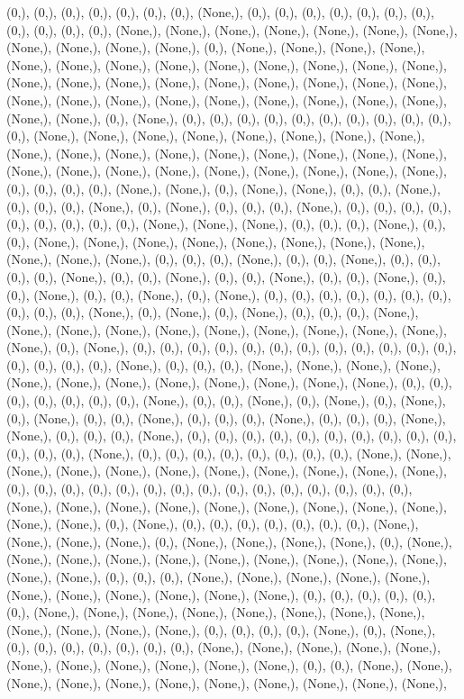 \documentclass{article}
\begin{document}
(0,), (0,), (0,), (0,), (0,), (0,), (0,), (None,), (0,), (0,), (0,), (0,), (0,), (0,), (0,), (0,), (0,), (0,), (0,), (None,), (None,), (None,), (None,), (None,), (None,), (None,), (None,), (None,), (None,), (None,), (0,), (None,), (None,), (None,), (None,), (None,), (None,), (None,), (None,), (None,), (None,), (None,), (None,), (None,), (None,), (None,), (None,), (None,), (None,), (None,), (None,), (None,), (None,), (None,), (None,), (None,), (None,), (None,), (None,), (None,), (None,), (None,), (None,), (None,), (0,), (None,), (0,), (0,), (0,), (0,), (0,), (0,), (0,), (0,), (0,), (0,), (0,), (None,), (None,), (None,), (None,), (None,), (None,), (None,), (None,), (None,), (None,), (None,), (None,), (None,), (None,), (None,), (None,), (None,), (None,), (None,), (None,), (None,), (None,), (None,), (None,), (None,), (None,), (0,), (0,), (0,), (0,), (None,), (None,), (0,), (None,), (None,), (0,), (0,), (None,), (0,), (0,), (0,), (None,), (0,), (None,), (0,), (0,), (0,), (None,), (0,), (0,), (0,), (0,), (0,), (0,), (0,), (0,), (0,), (None,), (None,), (None,), (0,), (0,), (0,), (None,), (0,), (0,), (None,), (None,), (None,), (None,), (None,), (None,), (None,), (None,), (None,), (None,), (None,), (0,), (0,), (0,), (None,), (0,), (0,), (None,), (0,), (0,), (0,), (0,), (None,), (0,), (0,), (None,), (0,), (0,), (None,), (0,), (0,), (None,), (0,), (0,), (None,), (0,), (0,), (None,), (0,), (None,), (0,), (0,), (0,), (0,), (0,), (0,), (0,), (0,), (0,), (0,), (None,), (0,), (None,), (0,), (None,), (0,), (0,), (0,), (None,), (None,), (None,), (None,), (None,), (None,), (None,), (None,), (None,), (None,), (None,), (0,), (None,), (0,), (0,), (0,), (0,), (0,), (0,), (0,), (0,), (0,), (0,), (0,), (0,), (0,), (0,), (0,), (0,), (None,), (0,), (0,), (0,), (None,), (None,), (None,), (None,), (None,), (None,), (None,), (None,), (None,), (None,), (None,), (None,), (0,), (0,), (0,), (0,), (0,), (0,), (0,), (None,), (0,), (0,), (None,), (0,), (None,), (0,), (None,), (0,), (None,), (0,), (0,), (None,), (0,), (0,), (0,), (None,), (0,), (0,), (0,), (None,), (None,), (0,), (0,), (0,), (None,), (0,), (0,), (0,), (0,), (0,), (0,), (0,), (0,), (0,), (0,), (0,), (0,), (0,), (None,), (0,), (0,), (0,), (0,), (0,), (0,), (0,), (0,), (None,), (None,), (None,), (None,), (None,), (None,), (None,), (None,), (None,), (None,), (None,), (0,), (0,), (0,), (0,), (0,), (0,), (0,), (0,), (0,), (0,), (0,), (0,), (0,), (0,), (0,), (None,), (None,), (None,), (None,), (None,), (None,), (None,), (None,), (None,), (None,), (None,), (0,), (None,), (0,), (0,), (0,), (0,), (0,), (0,), (0,), (None,), (None,), (None,), (None,), (0,), (None,), (None,), (None,), (None,), (0,), (None,), (None,), (None,), (None,), (None,), (None,), (None,), (None,), (None,), (None,), (None,), (None,), (0,), (0,), (0,), (None,), (None,), (None,), (None,), (None,), (None,), (None,), (None,), (None,), (None,), (None,), (0,), (0,), (0,), (0,), (0,), (0,), (None,), (None,), (None,), (None,), (None,), (None,), (None,), (None,), (None,), (None,), (None,), (None,), (0,), (0,), (0,), (0,), (None,), (0,), (None,), (0,), (0,), (0,), (0,), (0,), (0,), (0,), (None,), (None,), (None,), (None,), (None,), (None,), (None,), (None,), (None,), (None,), (None,), (0,), (0,), (None,), (None,), (None,), (None,), (None,), (None,), (None,), (None,), (None,), (None,), (None,), 
\end{document}
